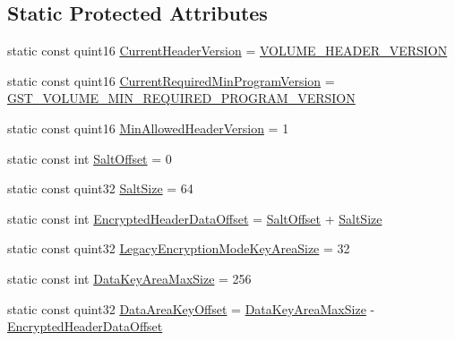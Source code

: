 \subsection*{Static Protected Attributes}
\begin{DoxyCompactItemize}
\item 
static const quint16 \hyperlink{class_gost_crypt_1_1_volume_1_1_volume_header_a89260a77af653fb9b99e0fc31a12da62}{Current\+Header\+Version} = \hyperlink{_volumes_8h_afc0155db6ffb15c5f34f923bf75ab0e8}{V\+O\+L\+U\+M\+E\+\_\+\+H\+E\+A\+D\+E\+R\+\_\+\+V\+E\+R\+S\+I\+ON}
\item 
static const quint16 \hyperlink{class_gost_crypt_1_1_volume_1_1_volume_header_ab94df3903320257c70fb8e3248bdcd2b}{Current\+Required\+Min\+Program\+Version} = \hyperlink{_volumes_8h_a23d7abc66b3f5e8bb8e8ac092505f8a5}{G\+S\+T\+\_\+\+V\+O\+L\+U\+M\+E\+\_\+\+M\+I\+N\+\_\+\+R\+E\+Q\+U\+I\+R\+E\+D\+\_\+\+P\+R\+O\+G\+R\+A\+M\+\_\+\+V\+E\+R\+S\+I\+ON}
\item 
static const quint16 \hyperlink{class_gost_crypt_1_1_volume_1_1_volume_header_a88bdc4e8ed22c6cbfca4d8008bc85b11}{Min\+Allowed\+Header\+Version} = 1
\item 
static const int \hyperlink{class_gost_crypt_1_1_volume_1_1_volume_header_ab1d2f5c41d0b24c592fd2048d73c2171}{Salt\+Offset} = 0
\item 
static const quint32 \hyperlink{class_gost_crypt_1_1_volume_1_1_volume_header_a37981e31384a8214ede95ed3d7e2e421}{Salt\+Size} = 64
\item 
static const int \hyperlink{class_gost_crypt_1_1_volume_1_1_volume_header_acd2e52603a1ef15adaa66bdc5e1ea794}{Encrypted\+Header\+Data\+Offset} = \hyperlink{class_gost_crypt_1_1_volume_1_1_volume_header_ab1d2f5c41d0b24c592fd2048d73c2171}{Salt\+Offset} + \hyperlink{class_gost_crypt_1_1_volume_1_1_volume_header_a37981e31384a8214ede95ed3d7e2e421}{Salt\+Size}
\item 
static const quint32 \hyperlink{class_gost_crypt_1_1_volume_1_1_volume_header_a7e4b73909a8b269c52d34de275166b8b}{Legacy\+Encryption\+Mode\+Key\+Area\+Size} = 32
\item 
static const int \hyperlink{class_gost_crypt_1_1_volume_1_1_volume_header_af27e0bcfd6be57f61941a209a5f1e73f}{Data\+Key\+Area\+Max\+Size} = 256
\item 
static const quint32 \hyperlink{class_gost_crypt_1_1_volume_1_1_volume_header_a7ac2bb5f9c033a9400ed6f1cdb8101ff}{Data\+Area\+Key\+Offset} = \hyperlink{class_gost_crypt_1_1_volume_1_1_volume_header_af27e0bcfd6be57f61941a209a5f1e73f}{Data\+Key\+Area\+Max\+Size} -\/ \hyperlink{class_gost_crypt_1_1_volume_1_1_volume_header_acd2e52603a1ef15adaa66bdc5e1ea794}{Encrypted\+Header\+Data\+Offset}
\end{DoxyCompactItemize}


